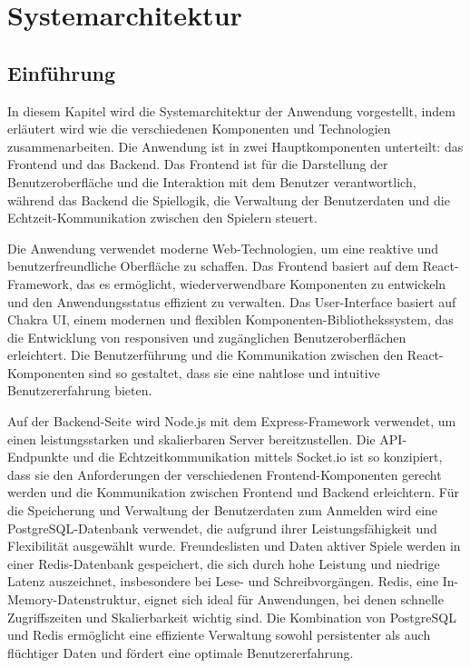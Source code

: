 \documentclass[a4paper,12pt]{report}
\newcommand{\footcite}[1]{\footnotemark\footnotetext{\cite{#1}}}
\begin{document}
        
\chapter{Systemarchitektur}
\section{Einführung}
In diesem Kapitel wird die Systemarchitektur der Anwendung vorgestellt, indem erläutert wird wie die verschiedenen Komponenten und Technologien zusammenarbeiten.
Die Anwendung ist in zwei Hauptkomponenten unterteilt: das Frontend und das Backend. Das Frontend ist für die Darstellung der Benutzeroberfläche und die Interaktion mit dem Benutzer verantwortlich, während das Backend die Spiellogik, die Verwaltung der Benutzerdaten und die Echtzeit-Kommunikation zwischen den Spielern steuert.

Die Anwendung verwendet moderne Web-Technologien, um eine reaktive und benutzerfreundliche Oberfläche zu schaffen. Das Frontend basiert auf dem React-Framework\footcite{react}, das es ermöglicht, wiederverwendbare Komponenten zu entwickeln und den Anwendungsstatus effizient zu verwalten. Das User-Interface basiert auf Chakra UI\footcite{chakraui}, einem modernen und flexiblen Komponenten-Bibliothekssystem, das die Entwicklung von responsiven und zugänglichen Benutzeroberflächen erleichtert. Die Benutzerführung und die Kommunikation zwischen den React-Komponenten sind so gestaltet, dass sie eine nahtlose und intuitive Benutzererfahrung bieten.

Auf der Backend-Seite wird Node.js\footcite{nodejs} mit dem Express-Framework verwendet, um einen leistungsstarken und skalierbaren Server bereitzustellen. Die API-Endpunkte und die Echtzeitkommunikation mittels Socket.io ist so konzipiert, dass sie den Anforderungen der verschiedenen Frontend-Komponenten gerecht werden und die Kommunikation zwischen Frontend und Backend erleichtern. Für die Speicherung und Verwaltung der Benutzerdaten zum Anmelden wird eine PostgreSQL\footcite{postgresql}-Datenbank verwendet, die aufgrund ihrer Leistungsfähigkeit und Flexibilität ausgewählt wurde. Freundeslisten und Daten aktiver Spiele werden in einer Redis\footcite{redis}-Datenbank gespeichert, die sich durch hohe Leistung und niedrige Latenz auszeichnet, insbesondere bei Lese- und Schreibvorgängen. Redis, eine In-Memory-Datenstruktur, eignet sich ideal für Anwendungen, bei denen schnelle Zugriffszeiten und Skalierbarkeit wichtig sind. Die Kombination von PostgreSQL und Redis ermöglicht eine effiziente Verwaltung sowohl persistenter als auch flüchtiger Daten und fördert eine optimale Benutzererfahrung.
\end{document}
